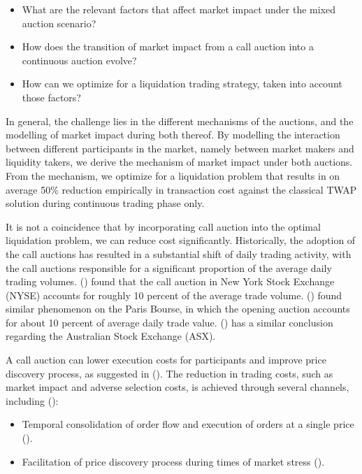 \begin{itemize}
  \item What are the relevant factors that affect market impact under the mixed auction scenario?
  \item How does the transition of market impact from a call auction into a continuous auction evolve?
  \item How can we optimize for a liquidation trading strategy, taken into account those factors?
\end{itemize}

In general, the challenge lies in the different mechanisms of the auctions, and the modelling of market impact during both thereof. By modelling the interaction between different participants in the market, namely between market makers and liquidity takers, we derive the mechanism of market impact under both auctions. From the mechanism, we optimize for a liquidation problem that results in on average 50\% reduction empirically in transaction cost against the classical TWAP solution during continuous trading phase only.

It is not a coincidence that by incorporating call auction into the optimal liquidation problem, we can reduce cost significantly. Historically, the adoption of the call auctions has resulted in a substantial shift of daily trading activity, with the call auctions responsible for a significant proportion of the average daily trading volumes. (\cite{Madhavan2015}) found that the call auction in New York Stock Exchange (NYSE) accounts for roughly 10 percent of the average trade volume. (\cite{Bruno1999}) found similar phenomenon on the Paris Bourse, in which the opening auction accounts for about 10 percent of average daily trade value. (\cite{Carole2006}) has a similar conclusion regarding the Australian Stock Exchange (ASX).

A call auction can lower execution costs for participants and improve price discovery process, as suggested in (\cite{Pagano2003}). The reduction in trading costs, such as market impact and adverse selection costs, is achieved through several channels, including (\cite{Carole2006}):

\begin{itemize}
  \item Temporal consolidation of order flow and execution of orders at a single price (\cite{Economides1995}).
  \item Facilitation of price discovery process during times of market stress (\cite{Madhavan1992}).
\end{itemize}

